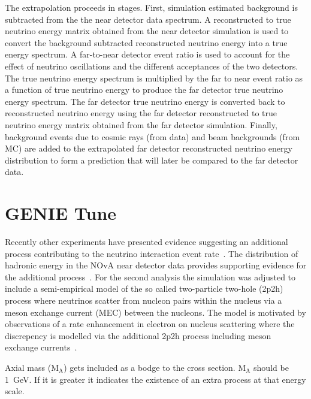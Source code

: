 The extrapolation proceeds in stages. 
First, simulation estimated background is subtracted from the the near
detector data spectrum.  
A reconstructed to true neutrino energy matrix obtained from the near
detector simulation is used to convert the background subtracted
reconstructed neutrino energy into a true energy spectrum. 
A far-to-near detector event ratio is used to account for the effect
of neutrino oscillations and the different acceptances of the two
detectors.
The true neutrino energy spectrum is multiplied by the far to near
event ratio as a function of true neutrino energy to produce the far
detector true neutrino energy spectrum.  The far detector
true neutrino energy is converted back to reconstructed
neutrino energy using the far detector reconstructed to true neutrino
energy matrix obtained from the far detector simulation. 
Finally, background events due to cosmic rays (from data) and beam
backgrounds (from MC) are added to the extrapolated far detector
reconstructed neutrino energy distribution to form a prediction that
will later be compared to the far detector data.
\cite{NOvASA}



\section{GENIE Tune}\label{sec:genietune}

Recently other experiments have presented evidence suggesting an
additional process contributing to the neutrino interaction event
rate~\cite{rodrigues2016identification}. 
The distribution of hadronic
energy in the NOvA near detector data provides supporting evidence for
the additional process~\cite{tuftsWeightNote}. 
For the second analysis the simulation was adjusted to include a
semi-empirical model of the so called two-particle two-hole (2p2h)
process where 
neutrinos scatter from nucleon pairs within the nucleus via a meson
exchange current (MEC) between the nucleons.
The model is motivated by observations of a rate enhancement in
electron on nucleus scattering where the discrepency is modelled via
the additional 2p2h process including meson exchange
currents~\cite{benhar2008inclusive}. 

Axial mass ($\text{M}_{\text{A}}$) gets included as a bodge to the
cross section. $\text{M}_{\text{A}}$ should be 1~GeV. 
If it is greater it indicates the existence of an extra process at
that energy scale. 

